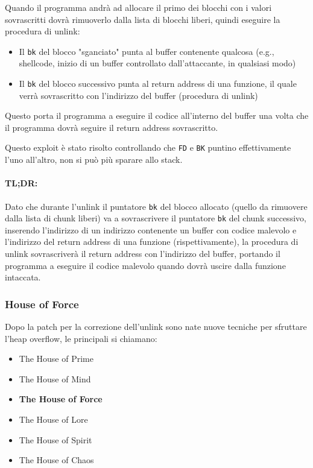 Quando il programma andrà ad allocare il primo dei blocchi con i valori sovrascritti dovrà rimuoverlo dalla lista di blocchi liberi, quindi eseguire la procedura di unlink:
\begin{itemize}
    \item Il \texttt{bk} del blocco "sganciato" punta al buffer contenente qualcosa (e.g., shellcode, inizio di un buffer controllato dall'attaccante, in qualsiasi modo)
    
    \item Il \texttt{bk} del blocco successivo punta al return address di una funzione, il quale verrà sovrascritto con l'indirizzo del buffer (procedura di unlink)
\end{itemize}

Questo porta il programma a eseguire il codice all'interno del buffer una volta che il programma dovrà seguire il return address sovrascritto.

Questo exploit è stato risolto controllando che \texttt{FD} e \texttt{BK} puntino effettivamente l'uno all'altro, non si può più sparare allo stack.

\vfill

\paragraph{TL;DR:} Dato che durante l'unlink il puntatore \texttt{bk} del blocco allocato (quello da rimuovere dalla lista di chunk liberi) va a sovrascrivere il puntatore \texttt{bk} del chunk successivo, inserendo l'indirizzo di un indirizzo contenente un buffer con codice malevolo e l'indirizzo del return address di una funzione (rispettivamente), la procedura di unlink sovrascriverà il return address con l'indirizzo del buffer, portando il programma a eseguire il codice malevolo quando dovrà uscire dalla funzione intaccata.

\subsubsection{House of Force}

Dopo la patch per la correzione dell'unlink sono nate nuove tecniche per sfruttare l'heap overflow, le principali si chiamano:
\begin{itemize}
	\item The House of Prime

	\item The House of Mind

	\item \textbf{The House of Force}

	\item The House of Lore

	\item The House of Spirit

	\item The House of Chaos
\end{itemize}

